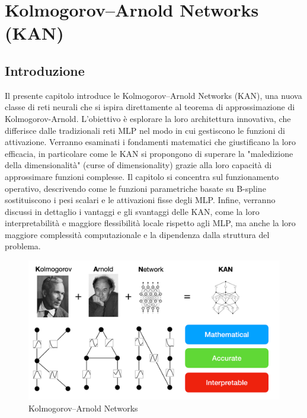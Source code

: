 \documentclass[a4paper,12pt]{report}
\begin{document}
	\chapter{Kolmogorov–Arnold Networks (KAN)}
	
	\section{Introduzione}
	Il presente capitolo introduce le Kolmogorov–Arnold Networks (KAN), una nuova classe di reti neurali che si ispira direttamente al teorema di approssimazione di Kolmogorov-Arnold. L'obiettivo è esplorare la loro architettura innovativa, che differisce dalle tradizionali reti MLP nel modo in cui gestiscono le funzioni di attivazione. Verranno esaminati i fondamenti matematici che giustificano la loro efficacia, in particolare come le KAN si propongono di superare la "maledizione della dimensionalità" (curse of dimensionality) grazie alla loro capacità di approssimare funzioni complesse. Il capitolo si concentra sul funzionamento operativo, descrivendo come le funzioni parametriche basate su B-spline sostituiscono i pesi scalari e le attivazioni fisse degli MLP. Infine, verranno discussi in dettaglio i vantaggi e gli svantaggi delle KAN, come la loro interpretabilità e maggiore flessibilità locale rispetto agli MLP, ma anche la loro maggiore complessità computazionale e la dipendenza dalla struttura del problema. \cite{liu2024kan, kolmogorov1957representation, arnold1963functions, donoho2000high, chaudhuri2021splines, yu2024kanvsmlp}
	
	\begin{figure}[H]
		\centering
		\includegraphics[width=1.0\textwidth]{img/kan_1st_image.png}
		\caption{Kolmogorov–Arnold Networks}
	\end{figure}
	
\end{document}
